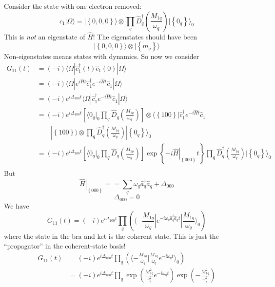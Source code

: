 Consider the state with one electron removed:
\[ \hat{c}_1|\Omega \rangle =|\left\{ 0,0,0 \right\} \rangle \otimes \prod_q{\hat{D}_{q}^{\dagger}\left( \frac{M_{1q}}{\omega _q} \right) |\left\{ 0_q \right\} \rangle _0}\]
This is \emph{not} an eigenstate of $\hat{H}$! The eigenstates should have been
\[ |\left\{ 0,0,0 \right\} \rangle \otimes |\left\{ m_q \right\} \rangle \]
Non-eigenstates means states with dynamics. So now we consider
\begin{align*}
    G_{11}\left( t \right) &=\left( -i \right) \langle \Omega |\hat{c}_{1}^{\dagger}\left( t \right) \hat{c}_1\left( 0 \right) |\Omega \rangle \\
    &=\left( -i \right) \langle \Omega |e^{i\hat{H}t}\hat{c}_{1}^{\dagger}e^{-i\hat{H}t}\hat{c}_1|\Omega \rangle \\
    &=\left( -i \right) e^{i\Delta _{100}t}\langle \Omega |\hat{c}_{1}^{\dagger}e^{-i\hat{H}t}\hat{c}_1|\Omega \rangle \\
    &=\left( -i \right) e^{i\Delta _{100}t}\left[ \langle 0_q|_0\prod_q{\hat{D}_q\left( \frac{M_{1q}}{\omega _q} \right)} \right] \otimes \langle \left\{ 100 \right\} |\hat{c}_{1}^{\dagger}e^{-i\hat{H}t}\hat{c}_1\\
    &\qquad|\left\{ 100 \right\} \rangle \otimes \prod_q{\hat{D}_{q}^{\dagger}\left( \frac{M_{1q}}{\omega _q} \right)}|\left\{ 0_q \right\} \rangle _0\\
    &=\left( -i \right) e^{i\Delta _{100}t}\left[ \langle 0_q|_0\prod_q{\hat{D}_q\left( \frac{M_{1q}}{\omega _q} \right)} \right] \exp \left\{ -i\left. \hat{H} \right|_{\left\{ 000 \right\}}t \right\}\prod_q{\hat{D}_{q}^{\dagger}\left( \frac{M_{1q}}{\omega _q} \right)}|\left\{ 0_q \right\} \rangle _0\\
\end{align*}
But
\[ \left. \hat{H} \right|_{\left\{ 000 \right\}}==\sum_q{\omega _q\hat{a}_{q}^{\dagger}\hat{a}_q}+\Delta _{000}\]
\[ \Delta _{000}=0\]
We have
\[ G_{11}\left( t \right) =\left( -i \right) e^{i\Delta _{100}t}\prod_q{\left( \langle -\frac{M_{1q}}{\omega _q}|e^{-i\omega _q\hat{a}_{q}^{\dagger}\hat{a}_qt}|\frac{M_{1q}}{\omega _q}\rangle _0 \right)}\]
where the state in the bra and ket is the coherent state. This is just the ``propagator'' in the coherent-state basis!
\begin{align*}
    G_{11}\left( t \right) &=\left( -i \right) e^{i\Delta _{100}t}\prod_q{\left( \langle -\frac{M_{1q}}{\omega _q}|\frac{M_{1q}}{\omega _q}e^{-i\omega _qt}\rangle _0 \right)}\\
    &=\left( -i \right) e^{i\Delta _{100}t}\prod_q{\exp \left( \frac{M_{1q}^{2}}{\omega _{q}^{2}}e^{-i\omega _qt} \right) \exp \left( -\frac{M_{1q}^{2}}{\omega _{q}^{2}} \right)}
\end{align*}
